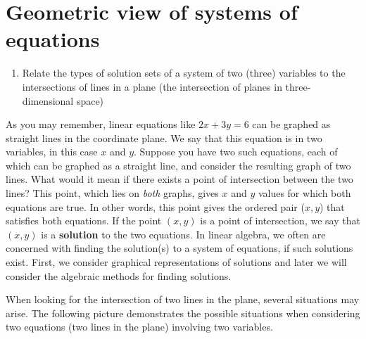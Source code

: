 \section{Geometric view of systems of equations}
\label{sec:systems-geometric}

\begin{outcome}
  \begin{enumerate}
  \item Relate the types of solution sets of a system of two (three)
    variables to the intersections of lines in a plane (the
    intersection of planes in three-dimensional space)
  \end{enumerate}
\end{outcome}

As you may remember, linear equations like $2x+3y=6$ can be graphed as
straight lines in the coordinate plane. We say that this equation is
in two variables, in this case $x$ and $y$.  Suppose you have two such
equations, each of which can be graphed as a straight line, and consider
the resulting graph of two lines. What would it mean if there exists a
point of intersection between the two lines? This point, which lies on
{\em both } graphs, gives $x$ and $y$ values for which both
equations are true. In other words, this point gives the ordered pair
($x,y$) that satisfies both equations.  If the point $(x, y
)$ is a point of intersection, we say that $(x, y)$
is a \textbf{solution} to the two equations. In linear algebra, we
often are concerned with finding the solution(s) to a system of
equations, if such solutions exist.  First, we consider graphical
representations of solutions and later we will consider the algebraic
methods for finding solutions.

When looking for the intersection of two lines in the plane, several situations may arise. The following picture demonstrates the possible situations
when considering two equations (two lines in the plane) involving two variables.



